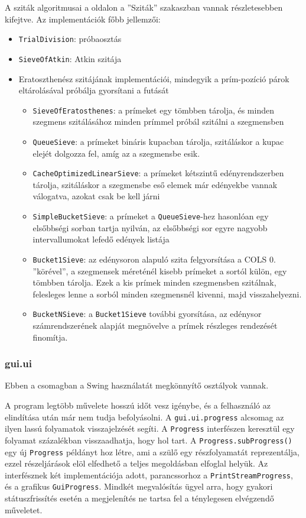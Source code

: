 A sziták algoritmusai a \pageref{sec:szitak} oldalon a ''Sziták'' szakaszban vannak részletesebben kifejtve.
Az implementációk főbb jellemzői:
\begin{itemize}
\item \texttt{TrialDivision}: próbaosztás
\item \texttt{SieveOfAtkin}: Atkin szitája
\item Eratoszthenész szitájának implementációi, mindegyik a prím-pozíció párok eltárolásával próbálja gyorsítani a futását
\begin{itemize}
\item \texttt{SieveOfEratosthenes}: a prímeket egy tömbben tárolja, és minden szegmens szitálásához minden prímmel próbál szitálni a szegmensben
\item \texttt{QueueSieve}: a prímeket bináris kupacban tárolja, szitáláskor a kupac elejét dolgozza fel, amíg az a szegmensbe esik.
\item \texttt{CacheOptimizedLinearSieve}: a prímeket kétszintű edényrendszerben tárolja, szitáláskor a szegmensbe eső elemek már edényekbe vannak válogatva, azokat csak be kell járni
\item \texttt{SimpleBucketSieve}: a prímeket a \texttt{QueueSieve}-hez hasonlóan egy elsőbbségi sorban tartja nyilván, az elsőbbségi sor egyre nagyobb intervallumokat lefedő edények listája
\item \texttt{Bucket1Sieve}: az edénysoron alapuló szita felgyorsítása a COLS 0. ''körével'', a szegmensek méreténél kisebb prímeket a sortól külön, egy tömbben tárolja. Ezek a kis prímek minden szegmensben szitálnak, felesleges lenne a sorból minden szegmensnél kivenni, majd visszahelyezni.
\item \texttt{BucketNSieve}: a \texttt{Bucket1Sieve} további gyorsítása, az edénysor számrendszerének alapját megnövelve a prímek részleges rendezését finomítja.
\end{itemize}
\end{itemize}

\subsubsection{gui.ui}

Ebben a csomagban a Swing használatát megkönnyítő osztályok vannak.

A program legtöbb művelete hosszú időt vesz igénybe, és a felhasználó az elindítása után már nem tudja befolyásolni.
A \texttt{gui.ui.progress} alcsomag az ilyen lassú folyamatok visszajelzését segíti.
A \texttt{Progress} interfészen keresztül egy folyamat százalékban visszaadhatja, hogy hol tart.
A \texttt{Progress.subProgress()} egy új \texttt{Progress} példányt hoz létre, ami a szülő egy részfolyamatát reprezentálja, ezzel részeljárások elöl elfedhető a teljes megoldásban elfoglal helyük.
Az interfésznek két implementációja adott, parancssorhoz a \texttt{PrintStreamProgress}, és a grafikus \texttt{GuiProgress}.
Mindkét megvalósítás ügyel arra, hogy gyakori státuszfrissítés esetén a megjelenítés ne tartsa fel a ténylegesen elvégzendő műveletet.

